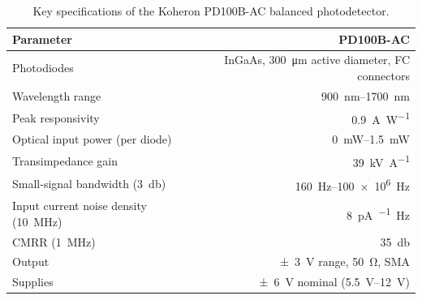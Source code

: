 \begin{table}[H]
	\centering
	\begin{tabular}{@{}lr@{}}
		\toprule
		\textbf{Parameter} & \textbf{PD100B-AC} \\
		\midrule
		Photodiodes                      & InGaAs, \SI{300}{\micro\metre} active diameter, FC connectors \\
		Wavelength range                 & \SIrange{900}{1700}{\nano\metre} \\
		Peak responsivity                & \SI{0.9}{\ampere\per\watt} \\
		Optical input power (per diode)  & \SIrange{0}{1.5}{\milli\watt} \\
		Transimpedance gain              & \SI{39}{\kilo\volt\per\ampere} \\
		Small-signal bandwidth (\SI{3}{\decibel}) & \SIrange{160}{100e6}{\hertz} \\
		Input current noise density (\SI{10}{\mega\hertz}) & \SI{8}{\pico\ampere\per\sqrt\hertz} \\
		CMRR (\SI{1}{\mega\hertz})       & \SI{35}{\decibel} \\
		Output                           & \SI{\pm 3}{\volt} range, \SI{50}{\ohm}, SMA \\
		Supplies                         & \SI{\pm 6}{\volt} nominal (\SIrange{5.5}{12}{\volt}) \\
		\bottomrule
	\end{tabular}
	\caption{Key specifications of the Koheron PD100B-AC balanced photodetector.}
	\label{tab:pd100b-full}
\end{table}
